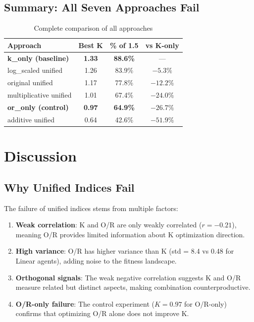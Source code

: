 \documentclass[twoside]{article}
\theoremstyle{remark}
\begin{document}
\subsection{Summary: All Seven Approaches Fail}

\begin{table}[h]
\centering
\caption{Complete comparison of all approaches}
\label{tab:all}
\begin{tabular}{@{}lccc@{}}
\toprule
\textbf{Approach} & \textbf{Best K} & \textbf{\% of 1.5} & \textbf{vs K-only} \\
\midrule
\textbf{k\_only (baseline)} & \textbf{1.33} & \textbf{88.6\%} & --- \\
log\_scaled unified & 1.26 & 83.9\% & $-5.3\%$ \\
original unified & 1.17 & 77.8\% & $-12.2\%$ \\
multiplicative unified & 1.01 & 67.4\% & $-24.0\%$ \\
\textbf{or\_only (control)} & \textbf{0.97} & \textbf{64.9\%} & $\mathbf{-26.7\%}$ \\
additive unified & 0.64 & 42.6\% & $-51.9\%$ \\
\bottomrule
\end{tabular}
\end{table}

\section{Discussion}

\subsection{Why Unified Indices Fail}

The failure of unified indices stems from multiple factors:

\begin{enumerate}
    \item \textbf{Weak correlation}: K and O/R are only weakly correlated ($r = -0.21$),
    meaning O/R provides limited information about K optimization direction.

    \item \textbf{High variance}: O/R has higher variance than K (std = 8.4
    vs 0.48 for Linear agents), adding noise to the fitness landscape.

    \item \textbf{Orthogonal signals}: The weak negative correlation suggests K and O/R
    measure related but distinct aspects, making combination counterproductive.

    \item \textbf{O/R-only failure}: The control experiment ($K = 0.97$ for O/R-only)
    confirms that optimizing O/R alone does not improve K.
\end{enumerate}
\end{document}
